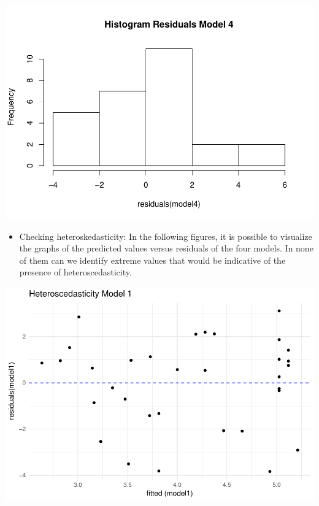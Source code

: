 \documentclass[]{elsarticle} %
\makeatletter
\providecommand{\tightlist}{%
  \setlength{\itemsep}{0pt}\setlength{\parskip}{0pt}}
\def\maxwidth{\ifdim\Gin@nat@width>\linewidth\linewidth
\else\Gin@nat@width\fi}
\let\Oldincludegraphics\includegraphics
\renewcommand{\includegraphics}[1]{\Oldincludegraphics[width=\maxwidth]{#1}}
\makeatother
\begin{document}
\includegraphics{refugees-stephanie_files/figure-latex/ggplot_resmodel_4-1.pdf}

\begin{itemize}
\tightlist
\item
  Checking heteroskedasticity: In the following figures, it is possible
  to visualize the graphs of the predicted values versus residuals of
  the four models. In none of them can we identify extreme values that
  would be indicative of the presence of heteroscedasticity.
\end{itemize}

\includegraphics{refugees-stephanie_files/figure-latex/ggplot_model_1-1.pdf}
\end{document}

